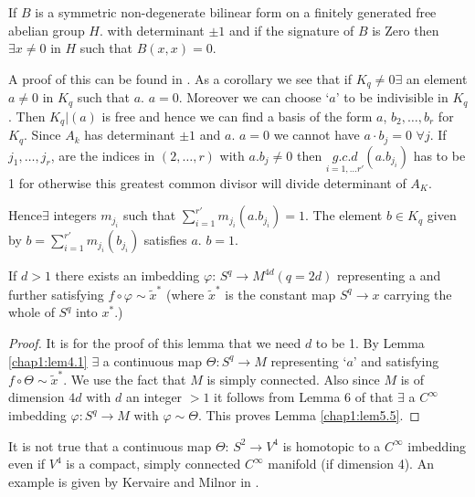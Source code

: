 \begin{lemma}\label{chap1:lem5.4}%
If $B$ is a symmetric non-degenerate bilinear form on a finitely
generated free abelian group $H$. with determinant $\pm 1$ and if the
signature of $B$ is Zero then $\exists x \neq 0$ in $H$ such that
$B(x, x) = 0$.

A proof of this can be found in \cite{c1:key6}. As a corollary we see that if
$K_q \neq 0 \exists $ an element $a \neq 0$ in $K_q$ such that
$a$. $a=0$. Moreover we can choose `$a$' to be indivisible in
$K_q$. Then $K_q | (a)$ is free and hence we can find a basis of the
form $a$, $b_2, \ldots, b_r$ for $K_q$. Since $A_k$ has determinant
$\pm 1$ and $a$. $a = 0$ we cannot have $a \cdot b_j = 0$ $ \forall j$. If
$j_1, \ldots, j_r$, are the indices in $(2, \ldots, r)$ with $a. b_j
\neq 0$ then $\underset{ i = 1, \ldots r'}{g. c. d} (a. b_{j_i})$ has
to be 1 for otherwise this greatest common divisor will divide
determinant of $A_K$. 

Hence\pageoriginale $\exists$ integers $m_{j_i}$ such that $
\sum\limits^{r'}_{i=1} 
m_{j_i} (a. b_{j_i}) = 1$. The element $b \in K_q$ given by $ b =
\sum\limits^{r'}_{i=1} m_{j_i} (b_{j_i})$ satisfies $a$. $b=1$. 
\end{lemma}

\begin{lemma}\label{chap1:lem5.5}%
If $d > 1$ there exists an imbedding $\varphi$: $S^q \to M^{4d} (q =
2d)$ representing a and further satisfying $f \circ \varphi \sim
\tilde{x}^*$ (where $\tilde{x}^*$ is the constant map $S^q \to x$
carrying the whole of $S^q$ into $x^*$.) 
\end{lemma}

\begin{proof}
It is for the proof of this lemma that we need $d$ to be 1. By Lemma
\ref{chap1:lem4.1} $\exists$ a continuous map $\Theta: S^q \to M$ representing
`$a$' and satisfying $f \circ \Theta \sim \tilde{x}^*$. We use the fact
that $M$ is simply connected. Also since $M$ is of dimension $4d$ with
$d$ an integer $ > 1$ it follows from Lemma 6 of \cite{c1:key6} that $\exists $ a
$C^\infty$ imbedding $\varphi: S^q \to M$ with $\varphi \sim
\Theta$. This proves Lemma \ref{chap1:lem5.5}. 
\end{proof}

\begin{remark*}
It is not true that a continuous map $\Theta$: $S^2 \to V^4$ is
homotopic to a $C^\infty$ imbedding even if $V^4$ is a compact, simply
connected $C^\infty$ manifold (if dimension 4). An example is given
by Kervaire and Milnor in \cite{c1:key3}.
\end{remark*}

